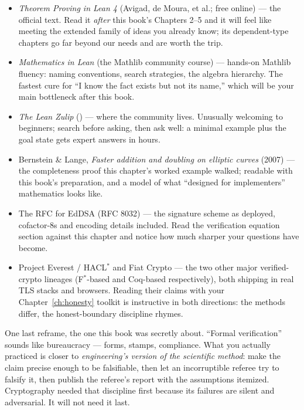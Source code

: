\begin{itemize}[leftmargin=1.4em]
\item \emph{Theorem Proving in Lean 4} (Avigad, de Moura, et al.; free
online) --- the official text. Read it \emph{after} this book's
Chapters 2--5 and it will feel like meeting the extended family of
ideas you already know; its dependent-type chapters go far beyond our
needs and are worth the trip.
\item \emph{Mathematics in Lean} (the Mathlib community course) ---
hands-on Mathlib fluency: naming conventions, search strategies, the
algebra hierarchy. The fastest cure for ``I know the fact exists but
not its name,'' which will be your main bottleneck after this book.
\item \emph{The Lean Zulip} () --- where
the community lives. Unusually welcoming to beginners; search before
asking, then ask well: a minimal example plus the goal state gets
expert answers in hours.
\item Bernstein \& Lange, \emph{Faster addition and doubling on
elliptic curves} (2007) --- the completeness proof this chapter's
worked example walked; readable with this book's preparation, and a
model of what ``designed for implementers'' mathematics looks like.
\item The RFC for EdDSA (RFC 8032) --- the signature scheme as
deployed, cofactor-$8$s and encoding details included. Read the
verification equation section against this chapter and notice how much
sharper your questions have become.
\item Project Everest / HACL$^{*}$ and Fiat Crypto --- the two other
major verified-crypto lineages (F$^{*}$-based and Coq-based
respectively), both shipping in real TLS stacks and browsers. Reading
their claims with your Chapter~\ref{ch:honesty} toolkit is instructive
in both directions: the methods differ, the honest-boundary discipline
rhymes.
\end{itemize}

\begin{aha}
One last reframe, the one this book was secretly about. ``Formal
verification'' sounds like bureaucracy --- forms, stamps, compliance. What
you actually practiced is closer to \emph{engineering's version of the
scientific method}: make the claim precise enough to be falsifiable, then
let an incorruptible referee try to falsify it, then publish the referee's
report with the assumptions itemized. Cryptography needed that discipline
first because its failures are silent and adversarial. It will not need it
last.
\end{aha}

